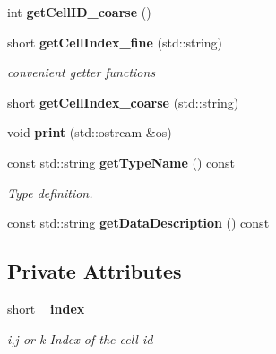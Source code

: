 \begin{DoxyCompactItemize}
\item 
int {\bfseries getCellID\_\-coarse} ()\label{classCALICE_1_1ConnCellMappingHcal_a8136c2a1622f865fcdab81cda25284e5}

\item 
short {\bf getCellIndex\_\-fine} (std::string)\label{classCALICE_1_1ConnCellMappingHcal_acede8240bf218adff8d40e23d7c7903a}

\begin{DoxyCompactList}\small\item\em convenient getter functions \item\end{DoxyCompactList}\item 
short {\bfseries getCellIndex\_\-coarse} (std::string)\label{classCALICE_1_1ConnCellMappingHcal_aeb22fd5dbacc508100ff4b34d8d6d5e4}

\item 
void {\bfseries print} (std::ostream \&os)\label{classCALICE_1_1ConnCellMappingHcal_ad40f3d45f299b067ba913d53651c9102}

\item 
const std::string {\bf getTypeName} () const \label{classCALICE_1_1ConnCellMappingHcal_a824a0896a35021b8ea42da52c9bfae38}

\begin{DoxyCompactList}\small\item\em Type definition. \item\end{DoxyCompactList}\item 
const std::string {\bfseries getDataDescription} () const \label{classCALICE_1_1ConnCellMappingHcal_a826f2d60b31e3329b5a68dccd014244f}

\end{DoxyCompactItemize}
\subsection*{Private Attributes}
\begin{DoxyCompactItemize}
\item 
short {\bf \_\-index}\label{classCALICE_1_1ConnCellMappingHcal_a63ebe04fafeb25e26b642d38b768cd71}

\begin{DoxyCompactList}\small\item\em i,j or k Index of the cell id \item\end{DoxyCompactList}\end{DoxyCompactItemize}


